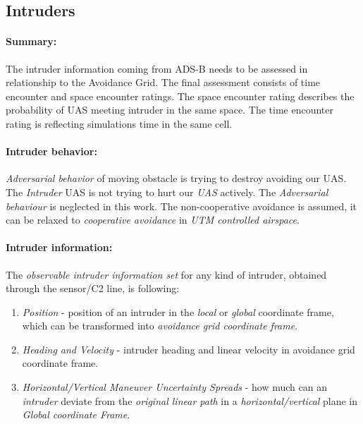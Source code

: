 \subsection{Intruders}\label{s:intruders}

\paragraph{Summary:} The intruder information coming from ADS-B needs to be assessed in relationship to the Avoidance Grid.  The final assessment consists of time encounter and space encounter ratings. The space encounter rating describes the probability of UAS meeting intruder in the same space. The time encounter rating is reflecting simulations time in the same cell. 

\paragraph{Intruder behavior:} \emph{Adversarial behavior} of moving obstacle is trying to destroy avoiding our UAS.  The \emph{Intruder} UAS \cite{fiorini1998motion} is not trying to hurt our \emph{UAS} actively. The \emph{Adversarial behaviour} is neglected in this work. The non-cooperative avoidance is assumed, it can be relaxed to \emph{cooperative avoidance} in \emph{UTM controlled airspace}.

\paragraph{Intruder information:} The \emph{observable intruder information set} for any kind of intruder, obtained through the sensor/C2 line, is following:
\begin{enumerate}
    \item\emph{Position} - position of an intruder in the \emph{local} or \emph{global} coordinate frame, which can be transformed into \emph{avoidance grid coordinate frame}.
    
    \item\emph{Heading and Velocity} - intruder heading and linear velocity in avoidance grid coordinate frame.
    
    \item\emph{Horizontal/Vertical Maneuver Uncertainty Spreads} - how much can an \emph{intruder} deviate from the \emph{original linear path} in a \emph{horizontal/vertical} plane in \emph{Global coordinate Frame}.
\end{enumerate}

